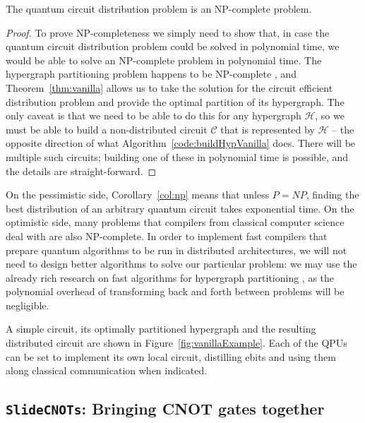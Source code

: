 \begin{corollary} The quantum circuit distribution problem is an NP-complete problem.
\label{col:np}
\end{corollary} \begin{proof}
To prove NP-completeness we simply need to show that, in case the quantum circuit distribution problem could be solved in polynomial time, we would be able to solve an NP-complete problem in polynomial time. The hypergraph partitioning problem happens to be NP-complete \citep{NP-complete}, and Theorem~\ref{thm:vanilla} allows us to take the solution for the circuit efficient distribution problem and provide the optimal partition of its hypergraph. The only caveat is that we need to be able to do this for any hypergraph \(\mathcal{H}\), so we must be able to build a non-distributed circuit \(\mathcal{C}\) that is represented by \(\mathcal{H}\) -- the opposite direction of what Algorithm~\ref{code:buildHypVanilla} does. There will be multiple such circuits; building one of these in polynomial time is possible, and the details are straight-forward.

\end{proof}

On the pessimistic side, Corollary~\ref{col:np} means that unless \(P=NP\), finding the best distribution of an arbitrary quantum circuit takes exponential time. On the optimistic side, many problems that compilers from classical computer science deal with are also NP-complete. In order to implement fast compilers that prepare quantum algorithms to be run in distributed architectures, we will not need to design better algorithms to solve our particular problem: we may use the already rich research on fast algorithms for hypergraph partitioning \citep{KaHyPart}, as the polynomial overhead of transforming back and forth between problems will be negligible.



A simple circuit, its optimally partitioned hypergraph and the resulting distributed circuit are shown in Figure~\ref{fig:vanillaExample}. Each of the QPUs can be set to implement its own local circuit, distilling ebits and using them along classical communication when indicated.


\subsection{\texttt{SlideCNOTs}: Bringing CNOT gates together}
\label{pullCNOTs}


